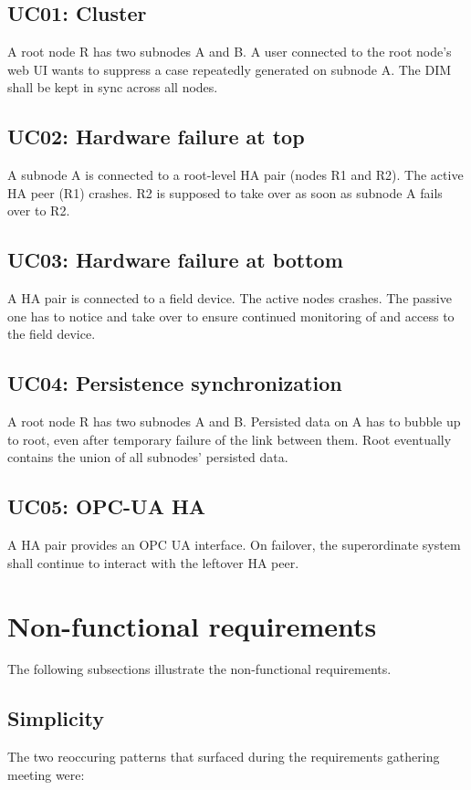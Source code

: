 \subsection{UC01: Cluster}
A root node R has two subnodes A and B. A user connected to the root node's web
UI wants to suppress a case repeatedly generated on subnode A. The DIM shall be
kept in sync across all nodes.

\subsection{UC02: Hardware failure at top}
A subnode A is connected to a root-level HA pair (nodes R1 and R2). The active
HA peer (R1) crashes. R2 is supposed to take over as soon as subnode A fails
over to R2.

\subsection{UC03: Hardware failure at bottom}
A HA pair is connected to a field device. The active nodes crashes. The passive
one has to notice and take over to ensure continued monitoring of and access to
the field device.

\subsection{UC04: Persistence synchronization}
A root node R has two subnodes A and B. Persisted data on A has to bubble up to
root, even after temporary failure of the link between them. Root eventually
contains the union of all subnodes' persisted data.

\subsection{UC05: OPC-UA HA}
A HA pair provides an OPC UA interface. On failover, the superordinate system
shall continue to interact with the leftover HA peer.

\section{Non-functional requirements}
The following subsections illustrate the non-functional requirements.

\subsection{Simplicity}
The two reoccuring patterns that surfaced during the requirements gathering
meeting were:

